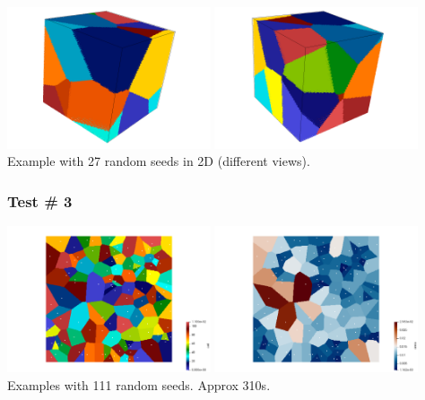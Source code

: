 \begin{center}
\includegraphics[width=6cm]{python_codes/fieldstone_125/results/test2_3Da}
\includegraphics[width=6cm]{python_codes/fieldstone_125/results/test2_3Db}\\
{\captionfont Example with 27 random seeds in 2D (different views).}
\end{center}

\subsubsection*{Test \# 3}

\begin{center}
\includegraphics[width=6cm]{python_codes/fieldstone_125/results/test3}
\includegraphics[width=6cm]{python_codes/fieldstone_125/results/test3_area}\\
{\captionfont Examples with 111 random seeds. Approx 310s.}
\end{center}

